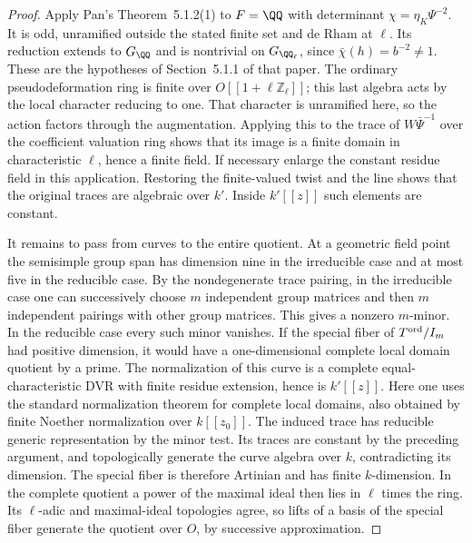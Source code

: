 \documentclass[a4paper,11pt]{article}
\theoremstyle{definition}
\theoremstyle{remark}
\newcommand{\ZZ}{\mathbb Z}\newcommand{\ord}{\operatorname{ord}}
\numberwithin{equation}{section}
\begin{document}
\begin{proof}
Apply Pan's Theorem~5.1.2(1) to \(F=\QQ\) with determinant
\(\chi=\eta_K\Psi^{-2}\). It is odd, unramified outside the
stated finite set and de Rham at \(\ell\). Its reduction extends
to \(G_\QQ\) and is nontrivial on \(G_{\QQ_\ell}\), since
\(\bar\chi(h)=b^{-2}\ne1\). These are the hypotheses of
Section~5.1.1 of that paper. The ordinary pseudodeformation
ring is finite over \(O[[1+\ell\ZZ_\ell]]\); this last
algebra acts by the local character reducing to one.
That character is unramified here, so the action factors
through the augmentation. Applying this to the trace of
\(W\bar\Psi^{-1}\) over the coefficient valuation ring shows
that its image is a finite domain in characteristic \(\ell\),
hence a finite field. If necessary enlarge the constant
residue field in this application. Restoring the
finite-valued twist and the line shows that the original
traces are algebraic over \(k'\). Inside \(k'[[z]]\) such
elements are constant.~\cite{XI-VIII-VI-pan40}

It remains to pass from curves to the entire quotient.
At a geometric field point the semisimple group span has
dimension nine in the irreducible case and at most five
in the reducible case. By the nondegenerate trace pairing,
in the irreducible case one can successively choose \(m\)
independent group matrices and then \(m\) independent
pairings with other group matrices. This gives a nonzero
\(m\)-minor. In the reducible case every such minor vanishes.
If the special fiber of \(T^{\rm ord}/I_m\) had positive
dimension, it would have a one-dimensional complete local
domain quotient by a prime. The normalization of this curve
is a complete equal-characteristic DVR with finite residue
extension, hence is \(k'[[z]]\). Here one uses the standard
normalization theorem for complete local domains, also
obtained by finite Noether normalization over \(k[[z_0]]\).
The induced trace has reducible generic representation by
the minor test. Its traces are constant by the preceding
argument, and topologically generate the curve algebra over
\(k\), contradicting its dimension. The special fiber is
therefore Artinian and has finite \(k\)-dimension. In the
complete quotient a power of the maximal ideal then lies
in \(\ell\) times the ring. Its \(\ell\)-adic and maximal-ideal
topologies agree, so lifts of a basis of the special fiber
generate the quotient over \(O\), by successive approximation.
\end{proof}
\end{document}

